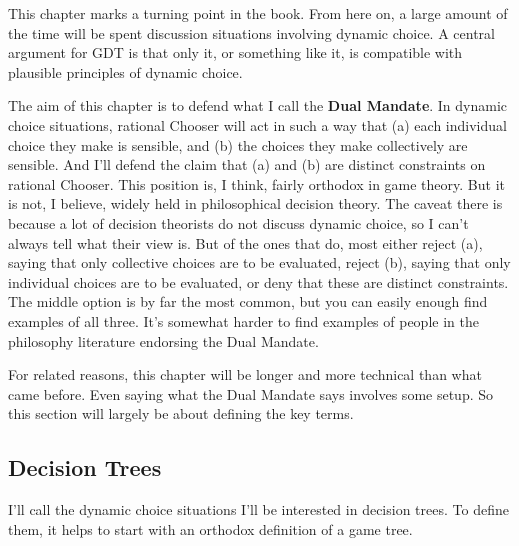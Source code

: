 \documentclass[
  12pt,
  letterpaper,
  DIV=11,
  numbers=noendperiod]{scrreprt}
\begin{document}
This chapter marks a turning point in the book. From here on, a large
amount of the time will be spent discussion situations involving dynamic
choice. A central argument for GDT is that only it, or something like
it, is compatible with plausible principles of dynamic choice.

The aim of this chapter is to defend what I call the \textbf{Dual
Mandate}. In dynamic choice situations, rational Chooser will act in
such a way that (a) each individual choice they make is sensible, and
(b) the choices they make collectively are sensible. And I'll defend the
claim that (a) and (b) are distinct constraints on rational Chooser.
This position is, I think, fairly orthodox in game theory. But it is
not, I believe, widely held in philosophical decision theory. The caveat
there is because a lot of decision theorists do not discuss dynamic
choice, so I can't always tell what their view is. But of the ones that
do, most either reject (a), saying that only collective choices are to
be evaluated, reject (b), saying that only individual choices are to be
evaluated, or deny that these are distinct constraints. The middle
option is by far the most common, but you can easily enough find
examples of all three. It's somewhat harder to find examples of people
in the philosophy literature endorsing the Dual Mandate.

For related reasons, this chapter will be longer and more technical than
what came before. Even saying what the Dual Mandate says involves some
setup. So this section will largely be about defining the key terms.

\hypertarget{sec-decision-tree}{%
\subsection{Decision Trees}\label{sec-decision-tree}}

I'll call the dynamic choice situations I'll be interested in decision
trees. To define them, it helps to start with an orthodox definition of
a game tree.
\end{document}
